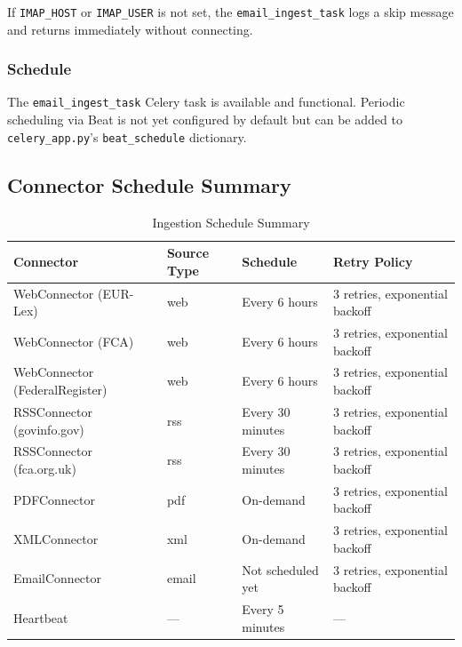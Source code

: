 \documentclass[12pt,a4paper]{article}
\begin{document}
If \texttt{IMAP\_HOST} or \texttt{IMAP\_USER} is not set, the \texttt{email\_ingest\_task} logs a skip message and returns immediately without connecting.

\subsubsection{Schedule}

The \texttt{email\_ingest\_task} Celery task is available and functional. Periodic scheduling via Beat is not yet configured by default but can be added to \texttt{celery\_app.py}'s \texttt{beat\_schedule} dictionary.

\subsection{Connector Schedule Summary}

\begin{table}[H]
\centering
\caption{Ingestion Schedule Summary}\label{tab:schedules}
\begin{tabularx}{\textwidth}{@{}l l l l@{}}
\toprule
\textbf{Connector} & \textbf{Source Type} & \textbf{Schedule} & \textbf{Retry Policy} \\
\midrule
WebConnector (EUR-Lex)           & web  & Every 6 hours     & 3 retries, exponential backoff \\
WebConnector (FCA)               & web  & Every 6 hours     & 3 retries, exponential backoff \\
WebConnector (FederalRegister)   & web  & Every 6 hours     & 3 retries, exponential backoff \\
RSSConnector (govinfo.gov)       & rss  & Every 30 minutes  & 3 retries, exponential backoff \\
RSSConnector (fca.org.uk)        & rss  & Every 30 minutes  & 3 retries, exponential backoff \\
PDFConnector                     & pdf  & On-demand         & 3 retries, exponential backoff \\
XMLConnector                     & xml  & On-demand         & 3 retries, exponential backoff \\
EmailConnector                   & email& Not scheduled yet & 3 retries, exponential backoff \\
Heartbeat                        & ---  & Every 5 minutes   & --- \\
\bottomrule
\end{tabularx}
\end{table}
\end{document}
